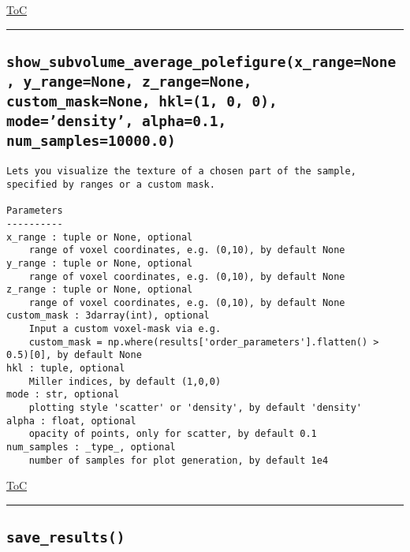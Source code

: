 \documentclass{article}
\begin{document}
\begin{flushright}

\hyperref[toc]{ToC}

\end{flushright}



\vspace{5mm}

\hrule

\subsection*{\texttt{show\_subvolume\_average\_polefigure(x\_range=None, y\_range=None, z\_range=None, custom\_mask=None, hkl=(1, 0, 0), mode='density', alpha=0.1, num\_samples=10000.0)}}
\label{fun:showsubvolumeaveragepolefigure}

\begin{lstlisting}[language=docstring]
Lets you visualize the texture of a chosen part of the sample, specified by ranges or a custom mask.

Parameters
----------
x_range : tuple or None, optional
    range of voxel coordinates, e.g. (0,10), by default None
y_range : tuple or None, optional
    range of voxel coordinates, e.g. (0,10), by default None
z_range : tuple or None, optional
    range of voxel coordinates, e.g. (0,10), by default None
custom_mask : 3darray(int), optional
    Input a custom voxel-mask via e.g. 
    custom_mask = np.where(results['order_parameters'].flatten() > 0.5)[0], by default None
hkl : tuple, optional
    Miller indices, by default (1,0,0)
mode : str, optional
    plotting style 'scatter' or 'density', by default 'density'
alpha : float, optional
    opacity of points, only for scatter, by default 0.1
num_samples : _type_, optional
    number of samples for plot generation, by default 1e4
\end{lstlisting}

\begin{flushright}

\hyperref[toc]{ToC}

\end{flushright}



\vspace{5mm}

\hrule

\subsection*{\texttt{save\_results()}}
\label{fun:saveresults}
\end{document}
